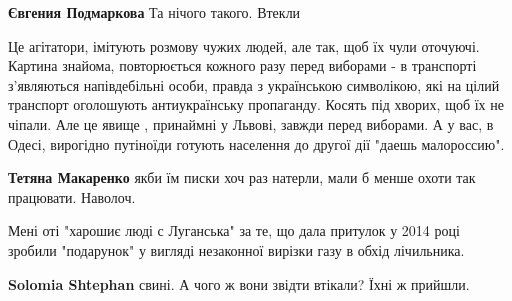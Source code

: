 \begin{itemize}
\begin{itemize}
\textbf{Євгения Подмаркова} Та нічого такого. Втекли
\end{itemize}

 

Це агітатори, імітують розмову чужих людей, але так, щоб їх чули оточуючі.
Картина знайома, повторюється кожного разу перед виборами - в транспорті
з'являються напівдебільні особи, правда з українською символікою, які на цілий
транспорт оголошують антиукраїнську пропаганду. Косять під хворих, щоб їх не
чіпали. Але це явище , принаймні у Львові, завжди перед виборами. А у вас, в
Одесі, вирогідно путіноїди готують населення до другої дії "даешь малороссию".

\begin{itemize}
 
\textbf{Тетяна Макаренко} якби їм писки хоч раз натерли, мали б менше охоти так працювати. Наволоч.
\end{itemize}

 
Мені оті "харошиє люді с Луганська" за те, що дала притулок у 2014 році зробили "подарунок" у вигляді незаконної вирізки газу в обхід лічильника.

\begin{itemize}
 
\textbf{Solomia Shtephan} свині. А чого ж вони звідти втікали? Їхні ж прийшли.
\end{itemize}



\end{itemize}
